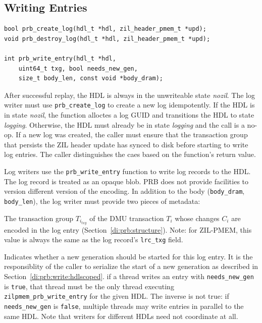 \documentclass[12pt,a4paper,twoside]{book}
\begin{document}

\subsection{Writing Entries}\label{di:prb:api:write}

\begin{lstlisting}
bool prb_create_log(hdl_t *hdl, zil_header_pmem_t *upd);
void prb_destroy_log(hdl_t *hdl, zil_header_pmem_t *upd);

int prb_write_entry(hdl_t *hdl,
    uint64_t txg, bool needs_new_gen,
    size_t body_len, const void *body_dram);
\end{lstlisting}

After successful replay, the HDL is always in the unwriteable state \textit{nozil}.
The log writer must use \lstinline{prb_create_log} to create a new log idempotently.
If the HDL is in state \textit{nozil}, the function alloctes a log GUID and transitions the HDL to state \textit{logging}.
Otherwise, the HDL must already be in state \textit{logging} and the call is a no-op.
If a new log was created, the caller must ensure that the transaction group that persists the ZIL header update has synced to disk before starting to write log entries.
The caller distinguishes the caes based on the function's return value.

Log writers use the \lstinline{prb_write_entry} function to write log records to the HDL.
The log record is treated as an opaque blob.
PRB does not provide facilities to version different version of the encoding.
In addition to the body (\lstinline{body_dram}, \lstinline{body_len}), the log writer must provide two pieces of metadata:
\begin{description}[noitemsep,leftmargin=1.5cm,labelindent=1cm]
    \item[txg] The transaction group $T_{i_{txg}}$ of the DMU transaction $T_i$ whose changes $C_i$ are encoded in the log entry (Section~\ref{di:prb:structure}).
        Note: for ZIL-PMEM, this value is always the same as the log record's \lstinline{lrc_txg} field.
    \item[needs\_new\_gen] Indicates whether a new generation should be started for this log entry.
        It is the responsiblity of the caller to serialize the start of a new generation as described in Section~\ref{di:prb:write:hdlscoped}.
        if a thread writes an entry with \lstinline{needs_new_gen} is \lstinline{true}, that thread must be the only thread executing \lstinline{zilpmem_prb_write_entry} for the given HDL.
        The inverse is not true: if \lstinline{needs_new_gen} is \lstinline{false}, multiple threads may write entries in parallel to the same HDL.
        Note that writers for different HDLs need not coordinate at all.
\end{description}
\end{document}

